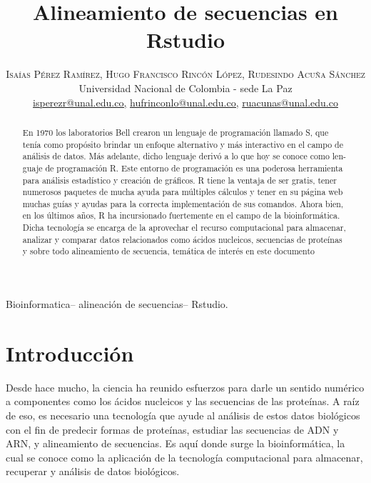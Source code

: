 \documentclass[usenatbib]{tjaa}
\title{Alineamiento de secuencias en Rstudio}%
\author{%
\textsc{\normalsize Isaías Pérez Ramírez, Hugo Francisco Rincón López, Rudesindo Acuña Sánchez } \\
\normalsize Universidad Nacional de Colombia - sede La Paz \\ %
\normalsize \href{mailto:isperezr@unal.edu.co}{isperezr@unal.edu.co,}
\normalsize \href{mailto:hufrinconlo@unal.edu.co}{hufrinconlo@unal.edu.co,}
\normalsize \href{mailto:ruacunas@unal.edu.co}{ruacunas@unal.edu.co}
}
\begin{document}
\label{empty}
\pagerange{\pageref{empty}--\pageref{empty}}

\begin{abstract}%
En 1970 los laboratorios Bell crearon un lenguaje de programación llamado
S, que tenía como propósito brindar un enfoque alternativo y más interactivo en el campo
de análisis de datos. Más adelante, dicho lenguaje derivó a lo que hoy se conoce como len-
guaje de programación R. Este entorno de programación es una poderosa herramienta para
análisis estadístico y creación de gráficos. R tiene la ventaja de ser gratis, tener numerosos
paquetes de mucha ayuda para múltiples cálculos y tener en su página web muchas guías y
ayudas para la correcta implementación de sus comandos. Ahora bien, en los últimos años,
R ha incursionado fuertemente en el campo de la bioinformática. Dicha tecnología se encarga de la aprovechar el recurso computacional para almacenar, analizar y comparar datos
relacionados como ácidos nucleicos, secuencias de proteínas y sobre todo alineamiento de
secuencia, temática de interés en este documento

\end{abstract}
\begin{keywords}
Bioinformatica--  alineación de secuencias-- Rstudio.

\end{keywords}

\section{Introducción}
Desde hace mucho, la ciencia ha reunido esfuerzos para darle un sentido numérico a componentes como los ácidos nucleicos y las secuencias de las proteínas. A raíz de eso, es necesario una tecnología que ayude al análisis de estos datos biológicos con el fin de predecir formas de proteínas, estudiar las secuencias de ADN y ARN, y alineamiento de secuencias. Es aquí donde surge la bioinformática, la cual se conoce como la aplicación de la tecnología computacional para almacenar, recuperar y análisis de datos biológicos. \\
\end{document}
